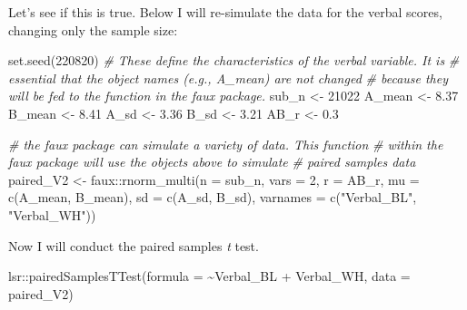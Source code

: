 \documentclass[
  11pt,
]{book}
\newenvironment{Shaded}{\begin{snugshade}}{\end{snugshade}}
\newcommand{\AttributeTok}[1]{\textcolor[rgb]{0.77,0.63,0.00}{#1}}
\newcommand{\CommentTok}[1]{\textcolor[rgb]{0.56,0.35,0.01}{\textit{#1}}}
\newcommand{\DecValTok}[1]{\textcolor[rgb]{0.00,0.00,0.81}{#1}}
\newcommand{\FloatTok}[1]{\textcolor[rgb]{0.00,0.00,0.81}{#1}}
\newcommand{\FunctionTok}[1]{\textcolor[rgb]{0.00,0.00,0.00}{#1}}
\newcommand{\NormalTok}[1]{#1}
\newcommand{\OtherTok}[1]{\textcolor[rgb]{0.56,0.35,0.01}{#1}}
\newcommand{\SpecialCharTok}[1]{\textcolor[rgb]{0.00,0.00,0.00}{#1}}
\newcommand{\StringTok}[1]{\textcolor[rgb]{0.31,0.60,0.02}{#1}}
\begin{document}
Let's see if this is true. Below I will re-simulate the data for the verbal scores, changing only the sample size:

\begin{Shaded}
\begin{Highlighting}[]
\FunctionTok{set.seed}\NormalTok{(}\DecValTok{220820}\NormalTok{)}
\CommentTok{\# These define the characteristics of the verbal variable. It is}
\CommentTok{\# essential that the object names (e.g., A\_mean) are not changed}
\CommentTok{\# because they will be fed to the function in the faux package.}
\NormalTok{sub\_n }\OtherTok{\textless{}{-}} \DecValTok{21022}
\NormalTok{A\_mean }\OtherTok{\textless{}{-}} \FloatTok{8.37}
\NormalTok{B\_mean }\OtherTok{\textless{}{-}} \FloatTok{8.41}
\NormalTok{A\_sd }\OtherTok{\textless{}{-}} \FloatTok{3.36}
\NormalTok{B\_sd }\OtherTok{\textless{}{-}} \FloatTok{3.21}
\NormalTok{AB\_r }\OtherTok{\textless{}{-}} \FloatTok{0.3}

\CommentTok{\# the faux package can simulate a variety of data. This function}
\CommentTok{\# within the faux package will use the objects above to simulate}
\CommentTok{\# paired samples data}
\NormalTok{paired\_V2 }\OtherTok{\textless{}{-}}\NormalTok{ faux}\SpecialCharTok{::}\FunctionTok{rnorm\_multi}\NormalTok{(}\AttributeTok{n =}\NormalTok{ sub\_n, }\AttributeTok{vars =} \DecValTok{2}\NormalTok{, }\AttributeTok{r =}\NormalTok{ AB\_r, }\AttributeTok{mu =} \FunctionTok{c}\NormalTok{(A\_mean,}
\NormalTok{    B\_mean), }\AttributeTok{sd =} \FunctionTok{c}\NormalTok{(A\_sd, B\_sd), }\AttributeTok{varnames =} \FunctionTok{c}\NormalTok{(}\StringTok{"Verbal\_BL"}\NormalTok{, }\StringTok{"Verbal\_WH"}\NormalTok{))}
\end{Highlighting}
\end{Shaded}

Now I will conduct the paired samples \emph{t} test.

\begin{Shaded}
\begin{Highlighting}[]
\NormalTok{lsr}\SpecialCharTok{::}\FunctionTok{pairedSamplesTTest}\NormalTok{(}\AttributeTok{formula =} \SpecialCharTok{\textasciitilde{}}\NormalTok{Verbal\_BL }\SpecialCharTok{+}\NormalTok{ Verbal\_WH, }\AttributeTok{data =}\NormalTok{ paired\_V2)}
\end{Highlighting}
\end{Shaded}
\end{document}
